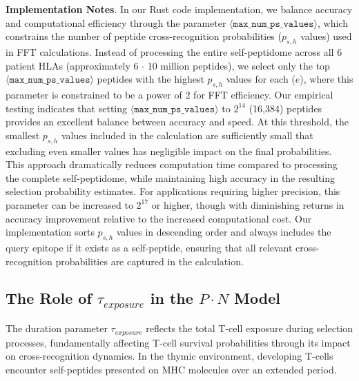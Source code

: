 \documentclass[11pt]{article}
\begin{document}
\textbf{Implementation Notes}. In our Rust code implementation, we balance accuracy and computational efficiency through the parameter $\langle\mathtt{max\_num\_ps\_values}\rangle$, which constrains the number of peptide cross-recognition probabilities (\(p_{s,h}\) values) used in FFT calculations. Instead of processing the entire self-peptidome across all 6 patient HLAs (approximately 6 $\cdot$ 10 million peptides), we select only the top $\langle\mathtt{max\_num\_ps\_values}\rangle$ peptides with the highest \(p_{s,h}\) values for each (\(e\)), where this parameter is constrained to be a power of 2 for FFT efficiency.
Our empirical testing indicates that setting $\langle\mathtt{max\_num\_ps\_values}\rangle$ to \(2^{14}\) (16,384) peptides provides an excellent balance between accuracy and speed. At this threshold, the smallest \(p_{s,h}\) values included in the calculation are sufficiently small that excluding even smaller values has negligible impact on the final probabilities. This approach dramatically reduces computation time compared to processing the complete self-peptidome, while maintaining high accuracy in the resulting selection probability estimates.
For applications requiring higher precision, this parameter can be increased to \(2^{17}\) or higher, though with diminishing returns in accuracy improvement relative to the increased computational cost. Our implementation sorts \(p_{s,h}\) values in descending order and always includes the query epitope if it exists as a self-peptide, ensuring that all relevant cross-recognition probabilities are captured in the calculation.


\subsection{The Role of $\tau_{exposure}$ in the \(P\cdot N\) Model}

The duration parameter $\tau_{exposure}$ reflects the total T-cell exposure during selection processes, fundamentally affecting T-cell survival probabilities through its impact on cross-recognition dynamics. In the thymic environment, developing T-cells encounter self-peptides presented on MHC molecules over an extended period. 
\end{document}

